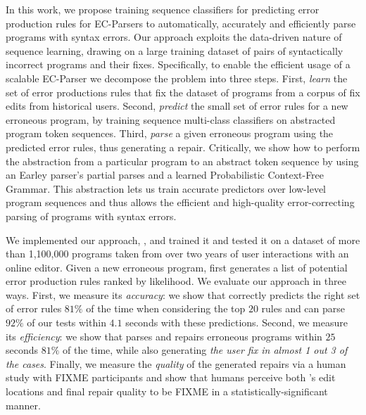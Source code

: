 In this work, we propose training sequence classifiers for predicting
error
production rules for EC-Parsers to automatically, accurately and
efficiently parse programs with syntax errors. Our approach exploits the data-driven
nature of sequence learning, drawing on a large training dataset of pairs
of syntactically incorrect programs and their fixes.
%
Specifically, to enable the efficient usage of a scalable EC-Parser we decompose
the problem into three steps.
%
First, \emph{learn} the set of error productions rules that fix the dataset of
programs from a corpus of fix edits from historical users.
%
Second, \emph{predict} the small set of error rules for a new erroneous program,
by training sequence multi-class classifiers on abstracted program token
sequences.
%
Third, \emph{parse} a given erroneous program using the predicted error rules,
thus generating a repair.
%
Critically, we show how to perform the abstraction from a particular
program to an abstract token sequence by using an Earley parser's
\citep{Earley_1970} partial parses and a learned Probabilistic Context-Free
Grammar. This abstraction lets us train accurate predictors over low-level
program sequences and thus allows the efficient and high-quality
error-correcting parsing of programs with syntax errors.

We implemented our approach, \toolname, and trained it and tested it on a
dataset of more than 1,100,000 programs taken from over two years of
user interactions with an online editor. Given a new erroneous program,
\toolname first generates a list of potential error production rules ranked by
likelihood. We evaluate our approach in three ways. 
%
First, we measure its \emph{accuracy}: we show that \toolname correctly predicts
the right set of error rules $81\%$ of the time when considering the top $20$
rules and can parse $92\%$ of our tests within $4.1$ seconds with these
predictions.
%
Second, we measure its \emph{efficiency}: we show that \toolname 
parses and repairs erroneous programs within $25$ seconds $81\%$ of the time,
while also generating \emph{the user fix in almost 1 out 3 of the cases}.
%
Finally, we measure the \emph{quality} of the generated repairs via a human study
with FIXME participants and show that humans perceive both \toolname's edit
locations and final repair quality to be FIXME in a statistically-significant manner.
